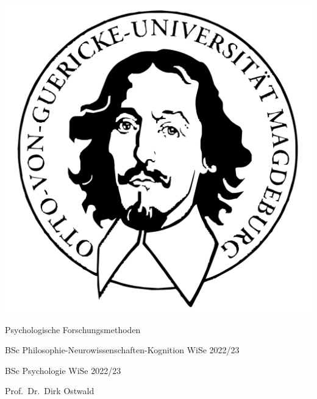 \documentclass[
  8pt,
  ignorenonframetext,
]{beamer}
\author{}
\date{\vspace{-2.5em}}
\begin{document}
\begin{frame}[plain]{}
\protect\hypertarget{section}{}
\center

\begin{center}\includegraphics[width=0.2\linewidth]{6_Abbildungen/pfm_6_otto} \end{center}

\vspace{2mm}

\Large

Psychologische Forschungsmethoden \vspace{6mm}

\normalsize

BSc Philosophie-Neurowissenschaften-Kognition WiSe 2022/23

BSc Psychologie WiSe 2022/23

\large
\vspace{6mm}

Prof.~Dr.~Dirk Ostwald
\end{frame}
\end{document}

